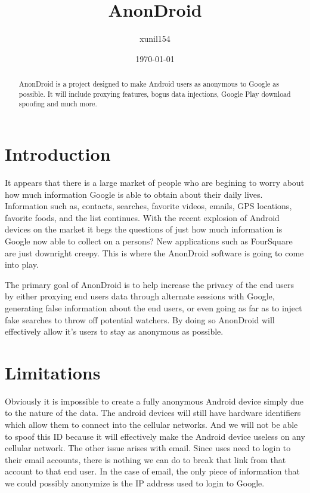 \documentclass[a4paper]{article}
\begin{document}
\title{AnonDroid}
\author{xunil154 }
\date{\today{}}

\maketitle

\vspace{6cm}
\begin{abstract}
AnonDroid is a project designed to make Android users as anonymous to Google as
possible. It will include proxying features, bogus data injections, Google Play
download spoofing and much more.
\end{abstract}

\cleardoublepage
\tableofcontents

\cleardoublepage


\section{Introduction}

  It appears that there is a large market of people who are begining to worry
about how much information Google is able to obtain about their daily lives.
Information such as, contacts, searches, favorite videos, emails, GPS
locations, favorite foods, and the list continues. With the recent explosion of
Android devices on the market it begs the questions of just how much
information is Google now able to collect on a persons? New applications such
as FourSquare are just downright creepy. This is where the AnonDroid software
is going to come into play.

  The primary goal of AnonDroid is to help increase the privacy of the end
users by either proxying end users data through alternate sessions with Google,
generating false information about the end users, or even going as far as to
inject fake searches to throw off potential watchers. By doing so AnonDroid will
effectively allow it's users to stay as anonymous as possible.


\section{Limitations}
  
  Obviously it is impossible to create a fully anonymous Android device
simply due to the nature of the data. The android devices will still have
hardware identifiers which allow them to connect into the cellular networks.
And we will not be able to spoof this ID because it will effectively make the
Android device useless on any cellular network. The other issue arises with 
email. Since uses need to login to their email accounts, there is nothing we can
do to break that link from that account to that end user. In the case of email,
the only piece of information that we could possibly anonymize is the IP
address used to login to Google.
\end{document}
